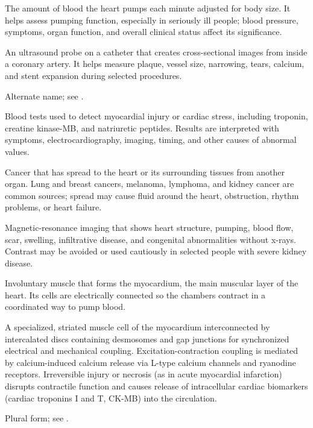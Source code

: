  The amount of blood the heart pumps each minute adjusted for body size. It helps assess pumping function, especially in seriously ill people; blood pressure, symptoms, organ function, and overall clinical status affect its significance.

 An ultrasound probe on a catheter that creates cross-sectional images from inside a coronary artery. It helps measure plaque, vessel size, narrowing, tears, calcium, and stent expansion during selected procedures.

 Alternate name; see .

 Blood tests used to detect myocardial injury or cardiac stress, including troponin, creatine kinase-MB, and natriuretic peptides. Results are interpreted with symptoms, electrocardiography, imaging, timing, and other causes of abnormal values.

 Cancer that has spread to the heart or its surrounding tissues from another organ. Lung and breast cancers, melanoma, lymphoma, and kidney cancer are common sources; spread may cause fluid around the heart, obstruction, rhythm problems, or heart failure.

 Magnetic-resonance imaging that shows heart structure, pumping, blood flow, scar, swelling, infiltrative disease, and congenital abnormalities without x-rays. Contrast may be avoided or used cautiously in selected people with severe kidney disease.

 Involuntary muscle that forms the myocardium, the main muscular layer of the heart. Its cells are electrically connected so the chambers contract in a coordinated way to pump blood.

 A specialized, striated muscle cell of the myocardium interconnected by intercalated discs containing desmosomes and gap junctions for synchronized electrical and mechanical coupling. Excitation-contraction coupling is mediated by calcium-induced calcium release via L-type calcium channels and ryanodine receptors. Irreversible injury or necrosis (as in acute myocardial infarction) disrupts contractile function and causes release of intracellular cardiac biomarkers (cardiac troponins I and T, CK-MB) into the circulation.

 Plural form; see .

